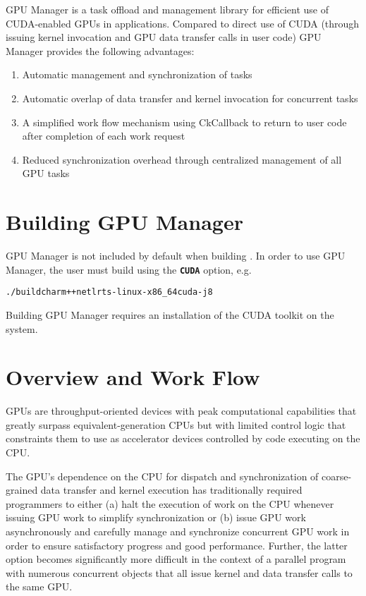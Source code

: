 \setcounter{secnumdepth}{3}

\renewcommand{\code}[1]{\texttt{\textbf{#1}}} %

\newcommand{\cuda}{\code{CUDA}}

GPU Manager is a task offload and management library for efficient use of
CUDA-enabled GPUs in \charmpp{} applications. Compared to direct use of CUDA
(through issuing kernel invocation and GPU data transfer calls in user
code) GPU Manager provides the following advantages:
\begin{enumerate}
\item Automatic management and synchronization of tasks
\item Automatic overlap of data transfer and kernel invocation for concurrent tasks
\item A simplified work flow mechanism using CkCallback to return to user code after completion of each work request
\item Reduced synchronization overhead through centralized management of all GPU tasks
\end{enumerate}

\section{Building GPU Manager}

GPU Manager is not included by default when building \charmpp{}. In order to use
GPU Manager, the user must build \charmpp{} using the \cuda{} option, e.g.

\begin{alltt}
./build charm++ netlrts-linux-x86_64 cuda -j8
\end{alltt}
Building GPU Manager requires an installation of the CUDA toolkit on the system.

\section{Overview and Work Flow}

GPUs are throughput-oriented devices with peak computational capabilities that
greatly surpass equivalent-generation CPUs but with limited control logic that
constraints them to use as accelerator devices controlled by code executing on
the CPU.

The GPU's dependence on the CPU for dispatch and synchronization of
coarse-grained data transfer and kernel execution has traditionally required
programmers to either (a) halt the execution of work on the CPU whenever issuing
GPU work to simplify synchronization or (b) issue GPU work asynchronously and
carefully manage and synchronize concurrent GPU work in order to ensure
satisfactory progress and good performance. Further, the latter option becomes
significantly more difficult in the context of a parallel program with numerous
concurrent objects that all issue kernel and data transfer calls to the same GPU.

